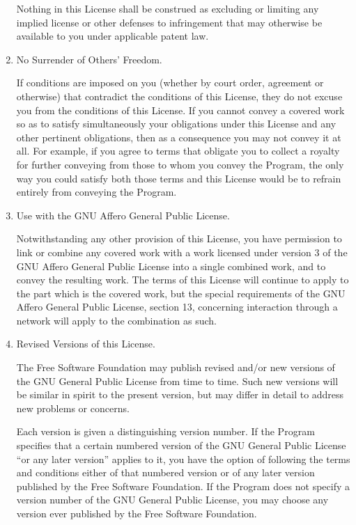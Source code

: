 \documentclass[11pt,twoside,fleqn,openright,titlepage]{cslreport}
\begin{document}
\begin{small}
\begin{enumerate}
Nothing in this License shall be construed as excluding or limiting
any implied license or other defenses to infringement that may
otherwise be available to you under applicable patent law.

\item No Surrender of Others' Freedom.

If conditions are imposed on you (whether by court order, agreement or
otherwise) that contradict the conditions of this License, they do not
excuse you from the conditions of this License.  If you cannot convey a
covered work so as to satisfy simultaneously your obligations under this
License and any other pertinent obligations, then as a consequence you may
not convey it at all.  For example, if you agree to terms that obligate you
to collect a royalty for further conveying from those to whom you convey
the Program, the only way you could satisfy both those terms and this
License would be to refrain entirely from conveying the Program.

\item Use with the GNU Affero General Public License.

Notwithstanding any other provision of this License, you have
permission to link or combine any covered work with a work licensed
under version 3 of the GNU Affero General Public License into a single
combined work, and to convey the resulting work.  The terms of this
License will continue to apply to the part which is the covered work,
but the special requirements of the GNU Affero General Public License,
section 13, concerning interaction through a network will apply to the
combination as such.

\item Revised Versions of this License.

The Free Software Foundation may publish revised and/or new versions of
the GNU General Public License from time to time.  Such new versions will
be similar in spirit to the present version, but may differ in detail to
address new problems or concerns.

Each version is given a distinguishing version number.  If the
Program specifies that a certain numbered version of the GNU General
Public License ``or any later version'' applies to it, you have the
option of following the terms and conditions either of that numbered
version or of any later version published by the Free Software
Foundation.  If the Program does not specify a version number of the
GNU General Public License, you may choose any version ever published
by the Free Software Foundation.


\end{enumerate}
\end{small}
\end{document}
